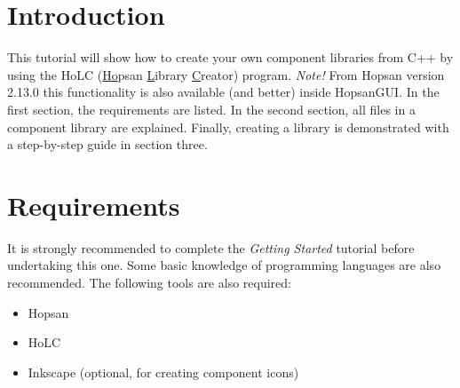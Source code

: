 \documentclass[a4paper,pdftex]{article}
\begin{document}

\section*{Introduction}
This tutorial will show how to create your own component libraries from C++ by using the HoLC (\underline{Ho}psan \underline{L}ibrary \underline{C}reator) program. \emph{Note!} From Hopsan version 2.13.0 this functionality is also available (and better) inside HopsanGUI. In the first section, the requirements are listed. In the second section, all files in a component library are explained. Finally, creating a library is demonstrated with a step-by-step guide in section three.

\section*{Requirements}
It is strongly recommended to complete the \textit{Getting Started} tutorial before undertaking this one. Some basic knowledge of programming languages are also recommended. 
The following tools are also required:
%
\begin{itemize} %
\itemsep -3pt
\item Hopsan
\item HoLC 
\item Inkscape (optional, for creating component icons)
\end{itemize} %
\end{document}
